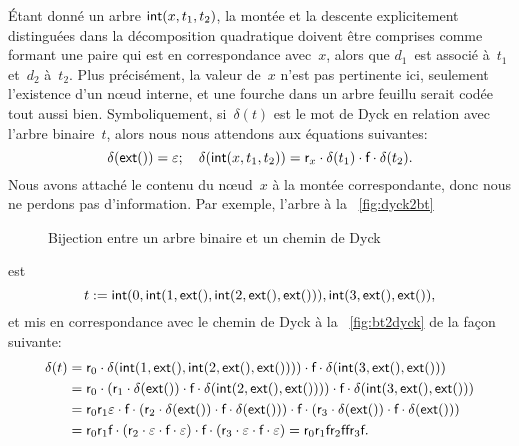 Étant donné un arbre \(\textsf{int}(x,t_1,t_2)\), la montée et la
descente explicitement distinguées dans la décomposition quadratique
doivent être comprises comme formant une paire qui est en
correspondance avec~\(x\), alors que \(d_1\)~est associé à~\(t_1\)
et~\(d_2\) à~\(t_2\). Plus précisément, la valeur de~\(x\) n'est pas
pertinente ici, seulement l'existence d'un nœud interne, et une
fourche dans un arbre feuillu serait codée tout aussi
bien. Symboliquement, si~\(\delta(t)\) est le mot de Dyck en relation
avec l'arbre binaire~\(t\), alors nous nous attendons aux équations
suivantes:
\begin{equation}
  \abovedisplayskip=6pt
  \belowdisplayskip=6pt
  \delta(\fun{ext}()) = \varepsilon; \quad
  \delta(\fun{int}(x,t_1,t_2)) = \fun{r}_{x} \cdot \delta(t_1) \cdot
  \fun{f} \cdot \delta(t_2).
  \label{eq:delta}
\end{equation}
Nous avons attaché le contenu du nœud~\(x\) à la montée
correspondante, donc nous ne perdons pas d'information. Par exemple,
l'arbre à la \fig~\vref{fig:dyck2bt}
\begin{figure}
\centering
{}
\qquad\quad
\subfloat[Chemin de Dyck correspondant au codage préfixe $[0,1,\Box,2,\Box,\Box,3,\Box,\Box\char93$\label{fig:bt2dyck}]{%
\texttt{[image: bt2dyck]}}
\caption{Bijection entre un arbre binaire et un chemin de Dyck}
\end{figure}
est
\begin{equation*}
  \abovedisplayskip=6pt
  \belowdisplayskip=6pt
  t := \fun{int}(0, \fun{int}(1, \fun{ext}(),
\fun{int}(2, \fun{ext}(), \fun{ext}())), \fun{int}(3, \fun{ext}(),
\fun{ext}()),
\end{equation*}
et mis en correspondance avec le chemin de Dyck à la
\fig~\vref{fig:bt2dyck} de la
façon suivante:
\begin{align*}
\delta(t)
&= \textsf{r}_0 \cdot \delta(\textsf{int}(1, \textsf{ext}(),
\textsf{int}(2, \textsf{ext}(), \textsf{ext}()))) \cdot \textsf{f} \cdot
\delta(\textsf{int}(3, \textsf{ext}(), \textsf{ext}()))\\ &= \textsf{r}_0
\cdot (\textsf{r}_1 \cdot \delta(\textsf{ext}()) \cdot \textsf{f} \cdot
\delta(\textsf{int}(2, \textsf{ext}(), \textsf{ext}()))) \cdot
\textsf{f} \cdot \delta(\textsf{int}(3, \textsf{ext}(), \textsf{ext}()))\\
&= \textsf{r}_0 \textsf{r}_1 \varepsilon \cdot \textsf{f} \cdot (\textsf{r}_2
\cdot \delta(\textsf{ext}()) \cdot \textsf{f} \cdot \delta(\textsf{ext}()))
\cdot \textsf{f} \cdot (\textsf{r}_3 \cdot \delta(\textsf{ext}()) \cdot \textsf{f}
\cdot \delta(\textsf{ext}()))\\
&= \textsf{r}_0 \textsf{r}_1 \textsf{f} \cdot (\textsf{r}_2 \cdot
\varepsilon \cdot \textsf{f} \cdot \varepsilon) \cdot
\textsf{f} \cdot (\textsf{r}_3 \cdot \varepsilon \cdot \textsf{f} \cdot
\varepsilon)
= \textsf{r}_0\textsf{r}_1\textsf{f}\textsf{r}_2\textsf{f}\textsf{f}\textsf{r}_3\textsf{f}.
\end{align*}
